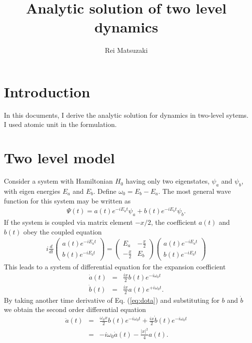 \documentclass[a4paper]{article}
\begin{document}
\title{Analytic solution of two level dynamics}
\author{Rei Matsuzaki}
\maketitle

\section{Introduction}
In this documents, I derive the analytic solution for dynamics in two-level sytems.
I used atomic unit in the formulation.

\section{Two level model}
Consider a system with Hamiltonian $H_0$ having only two eigenstates, $\psi_a$ and $\psi_b$,
with eigen energies $E_a$ and $E_b$. Define $\omega_0=E_b-E_a$. The most general wave function for this system may be
written as
\begin{eqnarray}
  \Psi(t) = a(t)e^{-iE_at}\psi_a + b(t)e^{-iE_bt}\psi_b.
\end{eqnarray}
If the system is coupled via matrix element $-x/2$, the coefficient $a(t)$ and $b(t)$
obey the coupled equation
\begin{eqnarray}
  i \frac{d}{dt}
  \begin{pmatrix}
    a(t) e^{-iE_at} \\
    b(t) e^{-iE_bt}
  \end{pmatrix}
  =  
  \begin{pmatrix}
    E_a          & -\frac{x}{2} \\
    -\frac{x}{2} & E_b
  \end{pmatrix}
  \begin{pmatrix}
    a(t)e^{-iE_at} \\
    b(t)e^{-iE_bt}
  \end{pmatrix}
\end{eqnarray}
This leads to a system of differential equation for the expansion coefficient
\begin{eqnarray}
  \dot{a}(t) &=& \frac{ix}{2}b(t)e^{-i\omega_0t}  \label{eq:dota} \\
  \dot{b}(t) &=& \frac{ix}{2}a(t)e^{+i\omega_0t}. \label{eq:dotb}
\end{eqnarray}
By taking another time derivative of Eq. (\ref{eq:dota}) and substituting for $b$ and $\dot{b}$
we obtain the second order differential equation
\begin{eqnarray}
  \ddot{a}(t)
  &=& \frac{\omega_0x}{2}b(t)e^{-i\omega_0t} + \frac{ix}{2}\dot{b}(t)e^{-i\omega_0t} \\
  &=& -i\omega_0\dot{a}(t) - \frac{|x|^2}{4}a(t).
\end{eqnarray}
\end{document}
